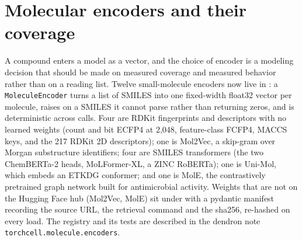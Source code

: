 
\section{Molecular encoders and their coverage}
\label{sec:encoders}

A compound enters a model as a vector, and the choice of encoder is a modeling
decision that should be made on measured coverage and measured behavior rather than
on a reading list. Twelve small-molecule encoders now live in
: a \texttt{MoleculeEncoder} turns a list of SMILES into one
fixed-width float32 vector per molecule, raises on a SMILES it cannot parse rather than
returning zeros, and is deterministic across calls. Four are RDKit fingerprints and
descriptors with no learned weights (count and bit ECFP4 at 2{,}048, feature-class
FCFP4, MACCS keys, and the 217 RDKit 2D descriptors); one is Mol2Vec, a skip-gram over
Morgan substructure identifiers; four are SMILES transformers (the two ChemBERTa-2
heads, MoLFormer-XL, a ZINC RoBERTa); one is Uni-Mol, which embeds an ETKDG conformer;
and one is MolE, the contrastively pretrained graph network built for antimicrobial
activity. Weights that are not on the Hugging Face hub (Mol2Vec, MolE) sit under
 with a pydantic manifest recording the source URL, the retrieval
command and the sha256, re-hashed on every load. The registry and its tests are
described in the dendron note \texttt{torchcell.molecule.encoders}.

